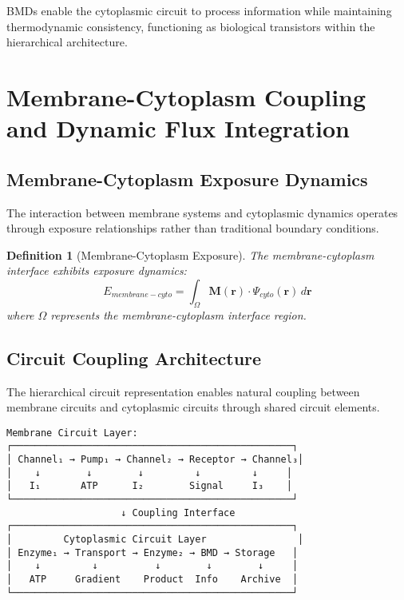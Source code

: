 \documentclass[12pt,a4paper]{article}
\newtheorem{definition}[theorem]{Definition}
\begin{document}
BMDs enable the cytoplasmic circuit to process information while maintaining thermodynamic consistency, functioning as biological transistors within the hierarchical architecture.

\section{Membrane-Cytoplasm Coupling and Dynamic Flux Integration}

\subsection{Membrane-Cytoplasm Exposure Dynamics}

The interaction between membrane systems and cytoplasmic dynamics operates through exposure relationships rather than traditional boundary conditions.

\begin{definition}[Membrane-Cytoplasm Exposure]
The membrane-cytoplasm interface exhibits exposure dynamics:
\begin{equation}
E_{membrane-cyto} = \int_{\Omega} \mathbf{M}(\mathbf{r}) \cdot \Psi_{cyto}(\mathbf{r}) \, d\mathbf{r}
\end{equation}
where $\Omega$ represents the membrane-cytoplasm interface region.
\end{definition}

\subsection{Circuit Coupling Architecture}

The hierarchical circuit representation enables natural coupling between membrane circuits and cytoplasmic circuits through shared circuit elements.

\begin{verbatim}
Membrane Circuit Layer:
┌─────────────────────────────────────────────────┐
│ Channel₁ → Pump₁ → Channel₂ → Receptor → Channel₃│
│    ↓        ↓        ↓         ↓         ↓     │
│   I₁       ATP      I₂        Signal     I₃    │
└─────────────────────────────────────────────────┘
                    ↓ Coupling Interface
┌─────────────────────────────────────────────────┐
│         Cytoplasmic Circuit Layer                │
│ Enzyme₁ → Transport → Enzyme₂ → BMD → Storage   │
│    ↓         ↓          ↓        ↓        ↓     │
│   ATP     Gradient    Product  Info    Archive  │
└─────────────────────────────────────────────────┘
\end{verbatim}
\end{document}
